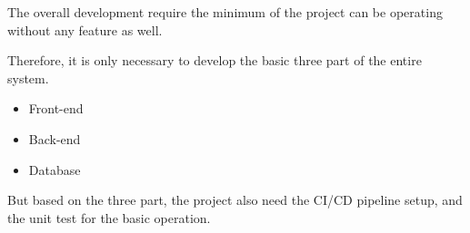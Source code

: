 The overall development require the minimum of the project can be operating 
without any feature as well.

Therefore, it is only necessary to develop the basic three part of the entire system.

\begin{itemize}
    \item Front-end
    \item Back-end
    \item Database
\end{itemize}

But based on the three part, the project also need the CI/CD pipeline setup,
and the unit test for the basic operation.

